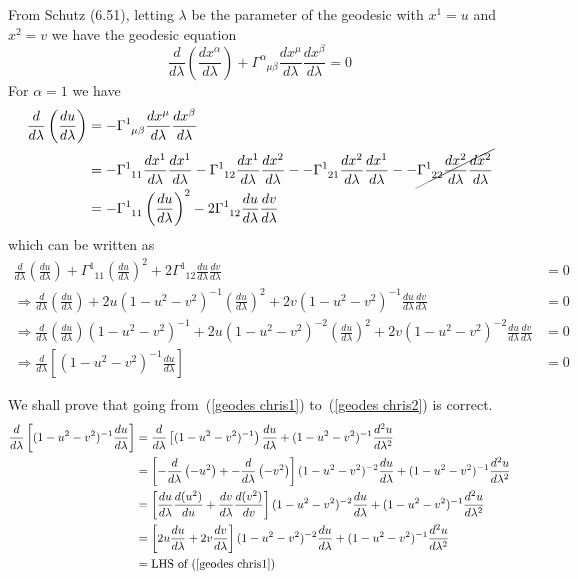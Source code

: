 \documentclass[a4paper]{article} %
\newcommand{\ph}[1]{\phantom{#1}}
\begin{document}
From Schutz (6.51), letting $\lambda$ be the parameter of the geodesic with $x^1=u$ and $x^2=v$ we have the geodesic equation
\begin{equation}
\frac{d}{d\lambda}\left(\frac{dx^{\alpha}}{d\lambda}\right)+\Gamma^{\alpha}_{\ph{\alpha}\mu\beta}
\frac{dx^{\mu}}{d\lambda}\frac{dx^{\beta}}{d\lambda}=0
\end{equation}
For $\alpha=1$ we have
\begin{align}
\frac{d}{d\lambda}\left(\frac{du}{d\lambda}\right)&=-\Gamma^{1}_{\ph{1}\mu\beta}
\frac{dx^{\mu}}{d\lambda}\frac{dx^{\beta}}{d\lambda}\\
&=-\Gamma^{1}_{\ph{1}11}\frac{dx^{1}}{d\lambda}\frac{dx^{1}}{d\lambda}
-\Gamma^{1}_{\ph{1}12}\frac{dx^{1}}{d\lambda}\frac{dx^{2}}{d\lambda}-
-\Gamma^{1}_{\ph{1}21}\frac{dx^{2}}{d\lambda}\frac{dx^{1}}{d\lambda}-
-\cancel{\Gamma^{1}_{\ph{1}22}\frac{dx^{2}}{d\lambda}\frac{dx^{2}}{d\lambda}}\\
&=-\Gamma^{1}_{\ph{1}11}\left(\frac{du}{d\lambda}\right)^2
-2\Gamma^{1}_{\ph{1}12}\frac{du}{d\lambda}\frac{dv}{d\lambda}
\end{align}
which can be written as
\begin{align}
\frac{d}{d\lambda}\left(\frac{du}{d\lambda}\right)+
\Gamma^{1}_{\ph{1}11}\left(\frac{du}{d\lambda}\right)^2
+2\Gamma^{1}_{\ph{1}12}\frac{du}{d\lambda}\frac{dv}{d\lambda}&=0\\
\Rightarrow \frac{d}{d\lambda}\left(\frac{du}{d\lambda}\right)+
2u(1-u^2-v^2)^{-1}\left(\frac{du}{d\lambda}\right)^2
+2v(1-u^2-v^2)^{-1}\frac{du}{d\lambda}\frac{dv}{d\lambda}&=0\label{geodes chris0}\\
\Rightarrow \frac{d}{d\lambda}\left(\frac{du}{d\lambda}\right)(1-u^2-v^2)^{-1}+
2u(1-u^2-v^2)^{-2}\left(\frac{du}{d\lambda}\right)^2
+2v(1-u^2-v^2)^{-2}\frac{du}{d\lambda}\frac{dv}{d\lambda}&=0\label{geodes chris1}\\
\Rightarrow \frac{d}{d\lambda}\left[(1-u^2-v^2)^{-1}\frac{du}{d\lambda}\right]&=0 \label{geodes chris2}
\end{align}

We shall prove that going from~(\ref{geodes chris1}) to~(\ref{geodes chris2}) is correct.
\begin{align}
\frac{d}{d\lambda}\left[(1-u^2-v^2)^{-1}\frac{du}{d\lambda}\right]&=
\frac{d}{d\lambda}\left[(1-u^2-v^2)^{-1}\right)\frac{du}{d\lambda}+(1-u^2-v^2)^{-1}\frac{d^2 u}{d\lambda^2}\\
&=\left[-\frac{d}{d\lambda}\left(-u^2\right)+-\frac{d}{d\lambda}\left(-v^2\right)\right]
(1-u^2-v^2)^{-2}\frac{du}{d\lambda}+(1-u^2-v^2)^{-1}\frac{d^2 u}{d\lambda^2}\\
&=\left[\frac{du}{d\lambda}\frac{d(u^2)}{du}+\frac{dv}{d\lambda}\frac{d(v^2)}{dv}\right]
(1-u^2-v^2)^{-2}\frac{du}{d\lambda}+(1-u^2-v^2)^{-1}\frac{d^2 u}{d\lambda^2}\\
&=\left[2u\frac{du}{d\lambda}+2v\frac{dv}{d\lambda}\right]
(1-u^2-v^2)^{-2}\frac{du}{d\lambda}+(1-u^2-v^2)^{-1}\frac{d^2 u}{d\lambda^2}\\
&=\text{LHS of}~(\ref{geodes chris1})
\end{align}
\end{document}
